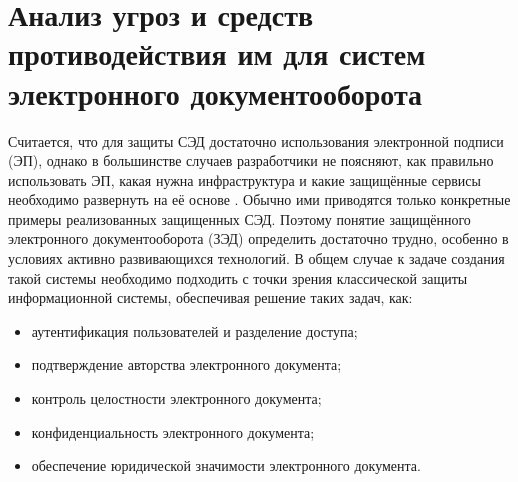 \section{Анализ угроз и средств противодействия им для систем электронного документооборота} \label{threats_main}

Считается, что для защиты СЭД достаточно использования электронной подписи (ЭП), однако в большинстве случаев разработчики не поясняют, как правильно использовать ЭП, какая нужна инфраструктура и какие защищённые сервисы необходимо развернуть на её основе \cite{buldakova}. Обычно ими приводятся только конкретные примеры реализованных защищенных СЭД. Поэтому понятие защищённого электронного документооборота (ЗЭД) определить достаточно трудно, особенно в условиях активно развивающихся технологий. В общем случае к задаче создания такой системы необходимо подходить с точки зрения классической защиты информационной системы, обеспечивая решение таких задач, как:
\begin{itemize}
	\item аутентификация пользователей и разделение доступа; 
	\item подтверждение авторства электронного документа; 
	\item контроль целостности электронного документа; 
	\item конфиденциальность электронного документа; 
	\item обеспечение юридической значимости электронного документа.
\end{itemize}

